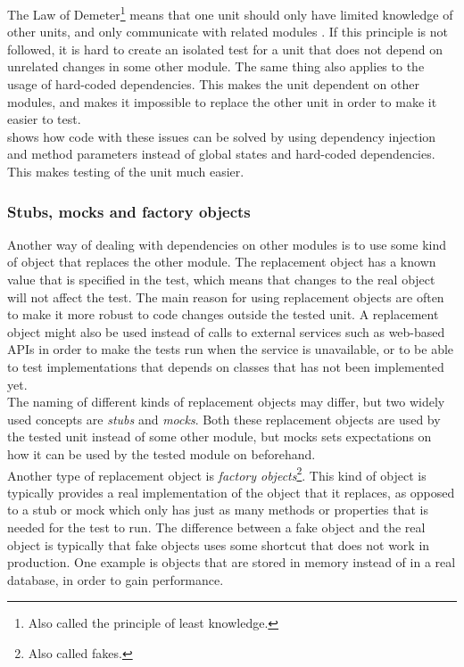 The Law of Demeter\footnote{Also called the principle of least
knowledge.} means that one unit should only have limited knowledge of
other units, and only communicate with related modules
\cite{wiki:demeter}. If this principle is not followed, it is hard to
create an isolated test for a unit that does not depend on unrelated
changes in some other module. The same thing also applies to the usage
of hard-coded dependencies. This makes the unit dependent on other
modules, and makes it impossible to replace the other unit in order to
make it easier to test.\\

\citeauthor{video:misko_psychology} shows how code with these issues can
be solved by using dependency injection and method parameters instead
of global states and hard-coded dependencies. This makes testing of the
unit much easier.\\


\subsubsection{Stubs, mocks and factory objects}
\label{sec:theory_mocks}

Another way of dealing with dependencies on other modules is to use some
kind of object that replaces the other module. The replacement object
has a known value that is specified in the test, which means that
changes to the real object will not affect the test. The main reason for
using replacement objects are often to make it more robust to code
changes outside the tested unit. A replacement object might also be used
instead of calls to external services such as web-based APIs in order
to make the tests run when the service is unavailable, or to be able to
test implementations that depends on classes that has not been
implemented yet.\\

The naming of different kinds of replacement objects may differ, but two
widely used concepts are \emph{stubs} and \emph{mocks}. Both these
replacement objects are used by the tested unit instead of some other
module, but mocks sets expectations on how it can be used by the tested
module on beforehand. \cite{web:mocks_arent_stubs}\\

Another type of replacement object is
\emph{factory objects}\footnote{Also called fakes.}.
This kind of object is typically provides a real implementation of the
object that it replaces, as opposed to a stub or mock which only has
just as many methods or properties that is needed for the test to run.
The difference between a fake object and the real object is typically
that fake objects uses some shortcut that does not work in production.
One example is objects that are stored in memory instead of in a real
database, in order to gain performance. \cite{web:mocks_arent_stubs}\\

